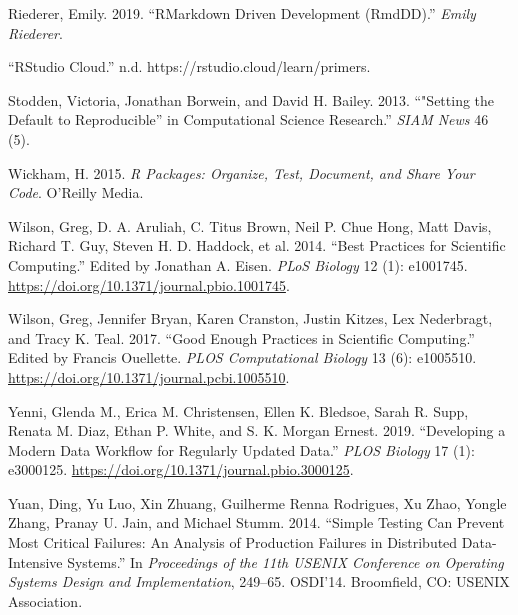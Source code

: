 \documentclass[
]{article}
\newlength{\cslhangindent}
\newenvironment{cslreferences}%
  {\setlength{\parindent}{0pt}%
  \everypar{\setlength{\hangindent}{\cslhangindent}}\ignorespaces}%
  {\par}
\begin{document}
\begin{cslreferences}
\leavevmode\hypertarget{ref-riederer_rmarkdowndrivendevelopment_2019}{}%
Riederer, Emily. 2019. ``RMarkdown Driven Development (RmdDD).''
\emph{Emily Riederer}.

\leavevmode\hypertarget{ref-_rstudiocloud_}{}%
``RStudio Cloud.'' n.d. https://rstudio.cloud/learn/primers.

\leavevmode\hypertarget{ref-stodden_setting_2013}{}%
Stodden, Victoria, Jonathan Borwein, and David H. Bailey. 2013.
``"Setting the Default to Reproducible'' in Computational Science
Research.'' \emph{SIAM News} 46 (5).

\leavevmode\hypertarget{ref-wickham_r_2015}{}%
Wickham, H. 2015. \emph{R Packages: Organize, Test, Document, and Share
Your Code}. O'Reilly Media.

\leavevmode\hypertarget{ref-wilson_best_2014}{}%
Wilson, Greg, D. A. Aruliah, C. Titus Brown, Neil P. Chue Hong, Matt
Davis, Richard T. Guy, Steven H. D. Haddock, et al. 2014. ``Best
Practices for Scientific Computing.'' Edited by Jonathan A. Eisen.
\emph{PLoS Biology} 12 (1): e1001745.
\url{https://doi.org/10.1371/journal.pbio.1001745}.

\leavevmode\hypertarget{ref-wilson_good_2017}{}%
Wilson, Greg, Jennifer Bryan, Karen Cranston, Justin Kitzes, Lex
Nederbragt, and Tracy K. Teal. 2017. ``Good Enough Practices in
Scientific Computing.'' Edited by Francis Ouellette. \emph{PLOS
Computational Biology} 13 (6): e1005510.
\url{https://doi.org/10.1371/journal.pcbi.1005510}.

\leavevmode\hypertarget{ref-yenni_developingmoderndata_2019}{}%
Yenni, Glenda M., Erica M. Christensen, Ellen K. Bledsoe, Sarah R. Supp,
Renata M. Diaz, Ethan P. White, and S. K. Morgan Ernest. 2019.
``Developing a Modern Data Workflow for Regularly Updated Data.''
\emph{PLOS Biology} 17 (1): e3000125.
\url{https://doi.org/10.1371/journal.pbio.3000125}.

\leavevmode\hypertarget{ref-yuan_simpletestingcan_2014}{}%
Yuan, Ding, Yu Luo, Xin Zhuang, Guilherme Renna Rodrigues, Xu Zhao,
Yongle Zhang, Pranay U. Jain, and Michael Stumm. 2014. ``Simple Testing
Can Prevent Most Critical Failures: An Analysis of Production Failures
in Distributed Data-Intensive Systems.'' In \emph{Proceedings of the
11th USENIX Conference on Operating Systems Design and Implementation},
249--65. OSDI'14. Broomfield, CO: USENIX Association.
\end{cslreferences}
\end{document}
